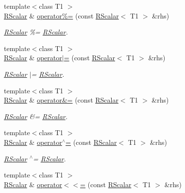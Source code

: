 \begin{DoxyCompactItemize}
{\footnotesize template$<$class T1 $>$ }\\\mbox{\hyperlink{classENSEM_1_1RScalar}{R\+Scalar}} \& \mbox{\hyperlink{classENSEM_1_1RScalar_ac5ab25042d679a621ccb42d13fb3b441}{operator\%=}} (const \mbox{\hyperlink{classENSEM_1_1RScalar}{R\+Scalar}}$<$ T1 $>$ \&rhs)
\begin{DoxyCompactList}\small\item\em \mbox{\hyperlink{classENSEM_1_1RScalar}{R\+Scalar}} \%= \mbox{\hyperlink{classENSEM_1_1RScalar}{R\+Scalar}}. \end{DoxyCompactList}\item 
{\footnotesize template$<$class T1 $>$ }\\\mbox{\hyperlink{classENSEM_1_1RScalar}{R\+Scalar}} \& \mbox{\hyperlink{classENSEM_1_1RScalar_ad5838d1c3d7169f6cc7f9b78fe42ac59}{operator$\vert$=}} (const \mbox{\hyperlink{classENSEM_1_1RScalar}{R\+Scalar}}$<$ T1 $>$ \&rhs)
\begin{DoxyCompactList}\small\item\em \mbox{\hyperlink{classENSEM_1_1RScalar}{R\+Scalar}} $\vert$= \mbox{\hyperlink{classENSEM_1_1RScalar}{R\+Scalar}}. \end{DoxyCompactList}\item 
{\footnotesize template$<$class T1 $>$ }\\\mbox{\hyperlink{classENSEM_1_1RScalar}{R\+Scalar}} \& \mbox{\hyperlink{classENSEM_1_1RScalar_aa091ededdea0fc13deb359321f213780}{operator\&=}} (const \mbox{\hyperlink{classENSEM_1_1RScalar}{R\+Scalar}}$<$ T1 $>$ \&rhs)
\begin{DoxyCompactList}\small\item\em \mbox{\hyperlink{classENSEM_1_1RScalar}{R\+Scalar}} \&= \mbox{\hyperlink{classENSEM_1_1RScalar}{R\+Scalar}}. \end{DoxyCompactList}\item 
{\footnotesize template$<$class T1 $>$ }\\\mbox{\hyperlink{classENSEM_1_1RScalar}{R\+Scalar}} \& \mbox{\hyperlink{classENSEM_1_1RScalar_ad69bdf7cec58f8ef8a8a42b250d97b25}{operator$^\wedge$=}} (const \mbox{\hyperlink{classENSEM_1_1RScalar}{R\+Scalar}}$<$ T1 $>$ \&rhs)
\begin{DoxyCompactList}\small\item\em \mbox{\hyperlink{classENSEM_1_1RScalar}{R\+Scalar}} $^\wedge$= \mbox{\hyperlink{classENSEM_1_1RScalar}{R\+Scalar}}. \end{DoxyCompactList}\item 
{\footnotesize template$<$class T1 $>$ }\\\mbox{\hyperlink{classENSEM_1_1RScalar}{R\+Scalar}} \& \mbox{\hyperlink{classENSEM_1_1RScalar_a4f12bedac2ac4848354e3c3018f6c9aa}{operator$<$$<$=}} (const \mbox{\hyperlink{classENSEM_1_1RScalar}{R\+Scalar}}$<$ T1 $>$ \&rhs)

\end{DoxyCompactItemize}
